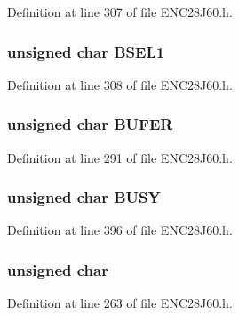 Definition at line 307 of file E\+N\+C28\+J60.\+h.

\hypertarget{union___r_e_g_a00910fe0dd3f6324dddf513ba337d5c9}{}
\subsubsection[{B\+S\+E\+L1}]{\setlength{\rightskip}{0pt plus 5cm}unsigned {\bf char} B\+S\+E\+L1}\label{union___r_e_g_a00910fe0dd3f6324dddf513ba337d5c9}


Definition at line 308 of file E\+N\+C28\+J60.\+h.

\hypertarget{union___r_e_g_a56912973403a75e702ff659bcb8b14ff}{}
\subsubsection[{B\+U\+F\+E\+R}]{\setlength{\rightskip}{0pt plus 5cm}unsigned {\bf char} B\+U\+F\+E\+R}\label{union___r_e_g_a56912973403a75e702ff659bcb8b14ff}


Definition at line 291 of file E\+N\+C28\+J60.\+h.

\hypertarget{union___r_e_g_a574887fd5c451dfb22c71d02ad76575a}{}
\subsubsection[{B\+U\+S\+Y}]{\setlength{\rightskip}{0pt plus 5cm}unsigned {\bf char} B\+U\+S\+Y}\label{union___r_e_g_a574887fd5c451dfb22c71d02ad76575a}


Definition at line 396 of file E\+N\+C28\+J60.\+h.

\hypertarget{union___r_e_g_afe71f11dacb15682cdc012f7208e6e09}{}
\subsubsection[{char}]{\setlength{\rightskip}{0pt plus 5cm}unsigned char}\label{union___r_e_g_afe71f11dacb15682cdc012f7208e6e09}


Definition at line 263 of file E\+N\+C28\+J60.\+h.

